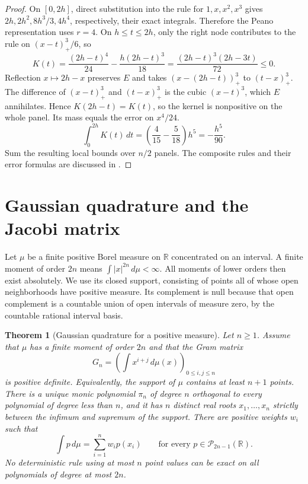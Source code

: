 \documentclass[11pt,oneside,openany]{book}
\theoremstyle{plain}
\newtheorem{theorem}{Theorem}[chapter]
\theoremstyle{definition}
\theoremstyle{remark}
\begin{document}
\begin{proof}
On \([0,2h]\), direct substitution into the rule for
\(1,x,x^2,x^3\) gives \(2h,2h^2,8h^3/3,4h^4\),
respectively, their exact integrals. Therefore the Peano
representation uses \(r=4\). On \(h\le t\le2h\), only the
right node contributes to the rule on \((x-t)_+^3/6\), so
\[
 K(t)=\frac{(2h-t)^4}{24}-\frac{h(2h-t)^3}{18}
      =\frac{(2h-t)^3(2h-3t)}{72}\le0 .
\]
Reflection \(x\mapsto2h-x\) preserves \(E\) and takes
\((x-(2h-t))_+^3\) to \((t-x)_+^3\).
The difference of \((x-t)_+^3\) and \((t-x)_+^3\) is
the cubic \((x-t)^3\), which \(E\) annihilates.
Hence \(K(2h-t)=K(t)\), so the kernel is nonpositive on
the whole panel. Its mass equals the error on \(x^4/24\).
\[
 \int_0^{2h}K(t)\,dt
 =\left(\frac4{15}-\frac5{18}\right)h^5=-\frac{h^5}{90}.
\]
Sum the resulting local bounds over \(n/2\) panels.
The composite rules and their error formulas are discussed in
\cite[Sections 3.1 and 3.2]{stoer}.
\end{proof}

\section{Gaussian quadrature and the Jacobi matrix}

Let \(\mu\) be a finite positive Borel measure on \(\mathbb R\)
concentrated on an interval. A finite moment of order \(2n\)
means \(\int |x|^{2n}\,d\mu<\infty\). All moments of lower
orders then exist absolutely. We use its closed support,
consisting of points all of whose open neighborhoods have
positive measure. Its complement is null because that open
complement is a countable union of open intervals of measure
zero, by the countable rational interval basis.

\begin{theorem}[Gaussian quadrature for a positive measure]\label{p206:W58}
Let \(n\ge1\). Assume that \(\mu\) has a finite moment of
order \(2n\) and that the Gram matrix
\[
 G_n=\left(\int x^{i+j}\,d\mu(x)\right)_{0\le i,j\le n}
\]
is positive definite. Equivalently, the support of \(\mu\)
contains at least \(n+1\) points. There is a unique monic
polynomial \(\pi_n\) of degree \(n\) orthogonal to every
polynomial of degree less than \(n\), and it has \(n\)
distinct real roots \(x_1,\ldots,x_n\) strictly between the
infimum and supremum of the support. There are positive
weights \(w_i\) such that
\[
 \int p\,d\mu=\sum_{i=1}^n w_i p(x_i)
 \qquad\text{for every }p\in\mathcal P_{2n-1}(\mathbb R).
\]
No deterministic rule using at most \(n\) point values can be exact on all
polynomials of degree at most \(2n\).
\end{theorem}
\end{document}
